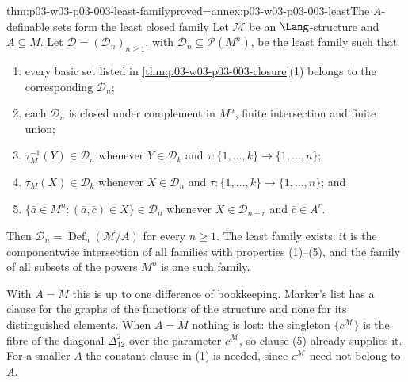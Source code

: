 \begin{hbtheorem}{thm:p03-w03-p03-003-least-family}{proved=annex:p03-w03-p03-003-least}{The \(A\)-definable sets form the least closed family}
Let \(\mathcal M\) be an \(\Lang\)-structure and \(A\subseteq M\).  Let
\(\mathcal D=(\mathcal D_n)_{n\geq1}\), with
\(\mathcal D_n\subseteq\mathcal P(M^n)\), be the least family such that
\begin{enumerate}
 \item every basic set listed in
       \cref{thm:p03-w03-p03-003-closure}(1) belongs to the corresponding
       \(\mathcal D_n\);
 \item each \(\mathcal D_n\) is closed under complement in \(M^n\), finite
       intersection and finite union;
 \item \(\tau_M^{-1}(Y)\in\mathcal D_n\) whenever \(Y\in\mathcal D_k\) and
       \(\tau:\{1,\ldots,k\}\to\{1,\ldots,n\}\);
 \item \(\tau_M(X)\in\mathcal D_k\) whenever \(X\in\mathcal D_n\) and
       \(\tau:\{1,\ldots,k\}\to\{1,\ldots,n\}\); and
 \item \(\{\bar a\in M^n:(\bar a,\bar c)\in X\}\in\mathcal D_n\) whenever
       \(X\in\mathcal D_{n+r}\) and \(\bar c\in A^r\).
\end{enumerate}
Then \(\mathcal D_n=\operatorname{Def}_n(\mathcal M/A)\) for every
\(n\geq1\).  The least family exists: it is the componentwise intersection
of all families with properties (1)--(5), and the family of all subsets of
the powers \(M^n\) is one such family.
\end{hbtheorem}

With \(A=M\) this is \cite[Proposition~1.3, p.~18]{Marker2000IntroductionModelTheory}
up to one difference of bookkeeping.  Marker's list has a clause for the
graphs of the functions of the structure and none for its distinguished
elements.  When \(A=M\) nothing is lost: the singleton
\(\{c^{\mathcal M}\}\) is the fibre of the diagonal \(\Delta^2_{12}\) over
the parameter \(c^{\mathcal M}\), so clause (5) already supplies it.  For a
smaller \(A\) the constant clause in (1) is needed, since \(c^{\mathcal M}\)
need not belong to \(A\).

